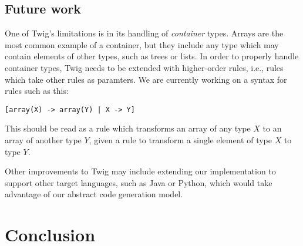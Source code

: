 
\subsection{Future work}

One of Twig's limitations is in its handling of \emph{container} types. Arrays are the most common example of a container, but they include any type which may contain elements of other types, such as trees or lists. In order to properly handle container types, Twig needs to be extended with higher-order rules, i.e., rules which take other rules as paramters. We are currently working on a syntax for rules such as this:

\begin{verbatim}
[array(X) -> array(Y) | X -> Y]
\end{verbatim}

This should be read as a rule which transforms an array of any type $X$ to an array of another type $Y$, given a rule to transform a single element of type $X$ to type $Y$.

Other improvements to Twig may include extending our implementation to support other target languages, such as Java or Python, which would take advantage of our abstract code generation model.

\section{Conclusion}


